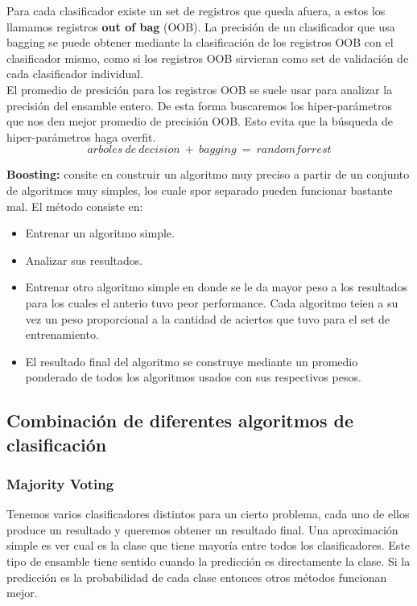 \documentclass[titlepage,a4paper]{article}
\begin{document}
Para cada clasificador existe un set de registros que queda afuera, a estos los llamamos registros \textbf{out of bag} (OOB). La precisión de un clasificador que usa bagging se puede obtener mediante la clasificación de los registros OOB con el clasificador mismo, como si los registros OOB sirvieran como set de validación de cada clasificador individual. \\

El promedio de presición para los registros OOB se suele usar para analizar la precisión del ensamble entero. De esta forma buscaremos los hiper-parámetros que nos den mejor promedio de precisión OOB. Esto evita que la búsqueda de hiper-parámetros haga overfit. \\

$$arboles\ de\ decision\ +\ bagging\ =\  random forrest$$

\textbf{Boosting:} consite en construir un algoritmo muy preciso a partir de un conjunto de algoritmos muy simples, los cuale spor separado pueden funcionar bastante mal. El método consiste en: 
\begin{itemize}
\item Entrenar un algoritmo simple. 
\item Analizar sus resultados. 
\item Entrenar otro algoritmo simple en donde se le da mayor peso a los resultados para los cuales el anterio tuvo peor performance. Cada algoritmo teien a su vez un peso proporcional a la cantidad de aciertos que tuvo para el set de entrenamiento. 
\item El resultado final del algoritmo se construye mediante un promedio ponderado de todos los algoritmos usados con sus respectivos pesos. 
\end{itemize}

\subsection*{Combinación de diferentes algoritmos de clasificación}
\subsubsection*{Majority Voting}
Tenemos varios clasificadores distintos para un cierto problema, cada uno de ellos produce un resultado y queremos obtener un resultado final. Una aproximación simple es  ver cual es la clase que tiene mayoría entre todos los clasificadores. Este tipo de ensamble tiene sentido cuando la predicción es directamente la clase. Si la predicción es la probabilidad de cada clase entonces otros métodos funcionan mejor. \\
\end{document}
